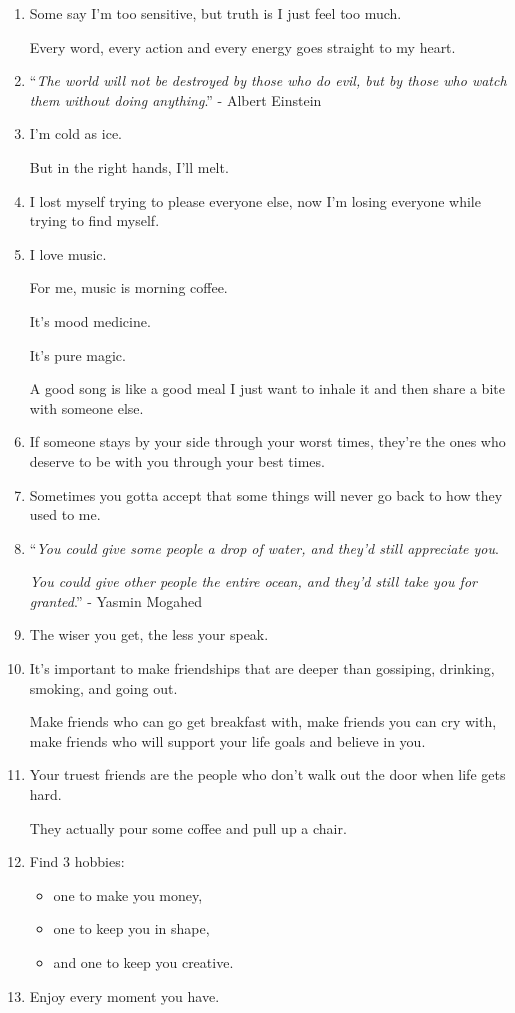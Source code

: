 \documentclass{article}
\numberwithin{equation}{section}
\begin{document}
\begin{enumerate}
    Then I will know you much better.
    \item Some say I'm too sensitive, but truth is I just feel too much.
    
    Every word, every action and every energy goes straight to my heart.
    \item ``\textit{The world will not be destroyed by those who do evil, but by those who watch them without doing anything}.'' - Albert Einstein
    \item I'm cold as ice.
    
    But in the right hands, I'll melt.
    \item I lost myself trying to please everyone else, now I'm losing everyone while trying to find myself.
    \item I love music.
    
    For me, music is morning coffee.
    
    It's mood medicine.
    
    It's pure magic.
    
    A good song is like a good meal I just want to inhale it and then share a bite with someone else.
    \item If someone stays by your side through your worst times, they're the ones who deserve to be with you through your best times.
    \item Sometimes you gotta accept that some things will never go back to how they used to me.
    \item ``\textit{You could give some people a drop of water, and they'd still appreciate you}.
    
    \textit{You could give other people the entire ocean, and they'd still take you for granted}.'' - Yasmin Mogahed
    \item The wiser you get, the less your speak.
    \item It's important to make friendships that are deeper than gossiping, drinking, smoking, and going out.
    
    Make friends who can go get breakfast with, make friends you can cry with, make friends who will support your life goals and believe in you.
    \item Your truest friends are the people who don't walk out the door when life gets hard.
    
    They actually pour some coffee and pull up a chair.
    \item Find 3 hobbies:
    \begin{itemize}
        \item one to make you money,
        \item one to keep you in shape,
        \item and one to keep you creative.
    \end{itemize}
    \item Enjoy every moment you have.
    

\end{enumerate}
\end{document}
